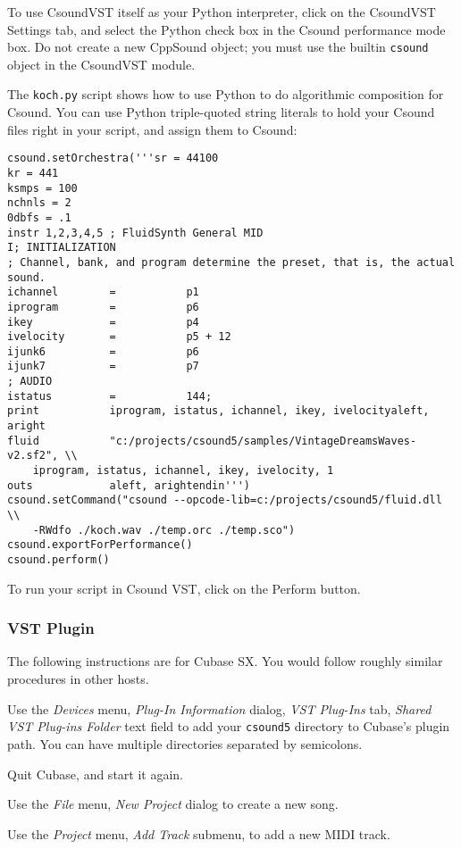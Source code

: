 \documentclass[10pt,letterpaper,onecolumn]{ltxguide}
\begin{document}
To use CsoundVST itself as your Python interpreter, click on the CsoundVST Settings tab, and select the Python check box in the Csound performance mode box. Do not create a new CppSound object; you must use the builtin \texttt{csound} object in the CsoundVST module. 

The \texttt{koch.py} script shows how to use Python to do algorithmic composition for Csound. You can use Python triple-quoted string literals to hold your Csound files right in your script, and assign them to Csound: 

\begin{lstlisting}
csound.setOrchestra('''sr = 44100
kr = 441
ksmps = 100   
nchnls = 2
0dbfs = .1
instr 1,2,3,4,5 ; FluidSynth General MID
I; INITIALIZATION
; Channel, bank, and program determine the preset, that is, the actual sound.
ichannel		=			p1
iprogram		=			p6
ikey	 		= 			p4
ivelocity 		= 			p5 + 12
ijunk6 			= 			p6
ijunk7			=			p7
; AUDIO
istatus			=			144;			
print			iprogram, istatus, ichannel, ikey, ivelocityaleft, aright		
fluid			"c:/projects/csound5/samples/VintageDreamsWaves-v2.sf2", \\
    iprogram, istatus, ichannel, ikey, ivelocity, 1			
outs 			aleft, arightendin''')
csound.setCommand("csound --opcode-lib=c:/projects/csound5/fluid.dll \\
    -RWdfo ./koch.wav ./temp.orc ./temp.sco")
csound.exportForPerformance()
csound.perform()
\end{lstlisting}

To run your script in Csound VST, click on the Perform button. 

\subsubsection{VST Plugin}
The following instructions are for Cubase SX. You would follow roughly similar procedures in other hosts.

Use the \emph{Devices} menu, \emph{Plug-In Information} dialog, \emph{VST Plug-Ins} tab, \emph{Shared VST Plug-ins Folder} text field to add your \texttt{csound5} directory to Cubase's plugin path. You can have multiple directories separated by semicolons. 

Quit Cubase, and start it again. 

Use the \emph{File} menu, \emph{New Project} dialog to create a new song. 

Use the \emph{Project} menu, \emph{Add Track} submenu, to add a new MIDI track. 
\end{document}
